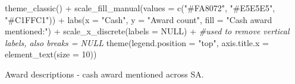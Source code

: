 \documentclass[
]{article}
\newenvironment{Shaded}{\begin{snugshade}}{\end{snugshade}}
\newcommand{\AttributeTok}[1]{\textcolor[rgb]{0.77,0.63,0.00}{#1}}
\newcommand{\CommentTok}[1]{\textcolor[rgb]{0.56,0.35,0.01}{\textit{#1}}}
\newcommand{\ConstantTok}[1]{\textcolor[rgb]{0.00,0.00,0.00}{#1}}
\newcommand{\DecValTok}[1]{\textcolor[rgb]{0.00,0.00,0.81}{#1}}
\newcommand{\FunctionTok}[1]{\textcolor[rgb]{0.00,0.00,0.00}{#1}}
\newcommand{\NormalTok}[1]{#1}
\newcommand{\SpecialCharTok}[1]{\textcolor[rgb]{0.00,0.00,0.00}{#1}}
\newcommand{\StringTok}[1]{\textcolor[rgb]{0.31,0.60,0.02}{#1}}
\begin{document}
\begin{Shaded}
\begin{Highlighting}[]
    \FunctionTok{theme\_classic}\NormalTok{() }\SpecialCharTok{+} 
    \FunctionTok{scale\_fill\_manual}\NormalTok{(}\AttributeTok{values =} \FunctionTok{c}\NormalTok{(}\StringTok{"\#FA8072"}\NormalTok{, }\StringTok{"\#E5E5E5"}\NormalTok{, }\StringTok{"\#C1FFC1"}\NormalTok{)) }\SpecialCharTok{+}
    \FunctionTok{labs}\NormalTok{(}\AttributeTok{x =} \StringTok{"Cash"}\NormalTok{, }\AttributeTok{y =} \StringTok{"Award count"}\NormalTok{, }\AttributeTok{fill =} \StringTok{"Cash award mentioned:"}\NormalTok{) }\SpecialCharTok{+} 
    \FunctionTok{scale\_x\_discrete}\NormalTok{(}\AttributeTok{labels =} \ConstantTok{NULL}\NormalTok{) }\SpecialCharTok{+} \CommentTok{\#used to remove vertical labels, also breaks = NULL}
    \FunctionTok{theme}\NormalTok{(}\AttributeTok{legend.position =} \StringTok{"top"}\NormalTok{, }\AttributeTok{axis.title.x =} \FunctionTok{element\_text}\NormalTok{(}\AttributeTok{size =} \DecValTok{10}\NormalTok{))}
\end{Highlighting}
\end{Shaded}

Award descriptions - cash award mentioned across SA.
\end{document}
